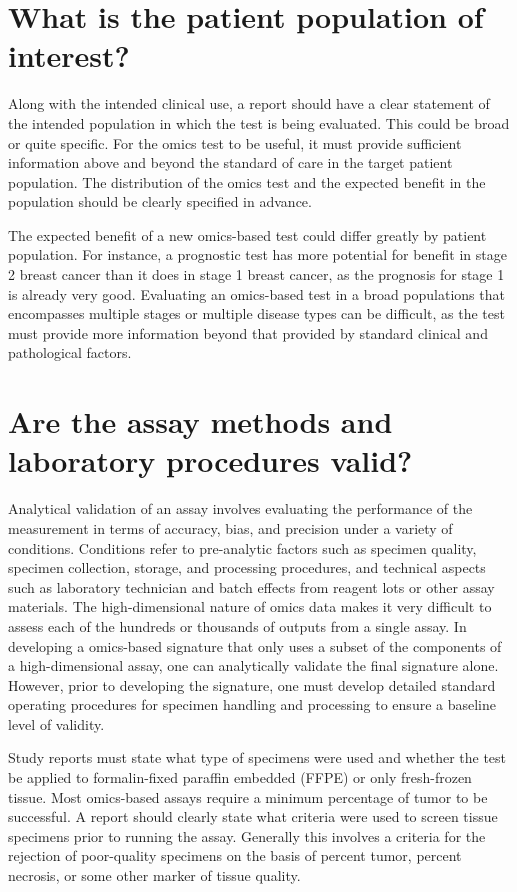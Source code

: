 \documentclass[11pt]{article}
\begin{document}
\section{What is the patient population of
interest?}\label{what-is-the-patient-population-of-interest}

Along with the intended clinical use, a report should have a clear
statement of the intended population in which the test is being
evaluated. This could be broad or quite specific. For the omics test to
be useful, it must provide sufficient information above and beyond the
standard of care in the target patient population. The distribution of
the omics test and the expected benefit in the population should be
clearly specified in advance.

The expected benefit of a new omics-based test could differ greatly by
patient population. For instance, a prognostic test has more potential
for benefit in stage 2 breast cancer than it does in stage 1 breast
cancer, as the prognosis for stage 1 is already very good. Evaluating an
omics-based test in a broad populations that encompasses multiple stages
or multiple disease types can be difficult, as the test must provide
more information beyond that provided by standard clinical and
pathological factors.

\section{Are the assay methods and laboratory procedures
valid?}\label{are-the-assay-methods-and-laboratory-procedures-valid}

Analytical validation of an assay involves evaluating the performance of
the measurement in terms of accuracy, bias, and precision under a
variety of conditions. Conditions refer to pre-analytic factors such as
specimen quality, specimen collection, storage, and processing
procedures, and technical aspects such as laboratory technician and
batch effects from reagent lots or other assay materials. The
high-dimensional nature of omics data makes it very difficult to assess
each of the hundreds or thousands of outputs from a single assay. In
developing a omics-based signature that only uses a subset of the
components of a high-dimensional assay, one can analytically validate
the final signature alone. However, prior to developing the signature,
one must develop detailed standard operating procedures for specimen
handling and processing to ensure a baseline level of validity.

Study reports must state what type of specimens were used and whether
the test be applied to formalin-fixed paraffin embedded (FFPE) or only
fresh-frozen tissue. Most omics-based assays require a minimum
percentage of tumor to be successful. A report should clearly state what
criteria were used to screen tissue specimens prior to running the
assay. Generally this involves a criteria for the rejection of
poor-quality specimens on the basis of percent tumor, percent necrosis,
or some other marker of tissue quality.
\end{document}
